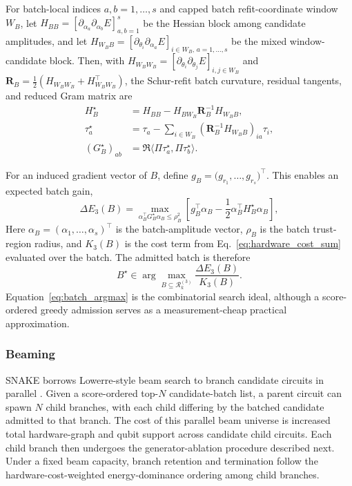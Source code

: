 \documentclass[
  reprint,
  amsmath,
  amssymb,
  aps,
  pra,
  nofootinbib,
  superscriptaddress,
  floatfix
]{revtex4-2}
\begin{document}
For batch-local indices \(a,b=1,\ldots,s\) and capped batch refit-coordinate window \(W_B\), let $H_{BB}=[\partial_{\alpha_a}\partial_{\alpha_b}E]_{a,b=1}^s$ be the Hessian block among candidate amplitudes, and let $H_{W_BB}=[\partial_{\theta_i}\partial_{\alpha_a}E]_{i\in W_B,\,a=1,\ldots,s}$ be the mixed window-candidate block. Then, with $H_{W_BW_B}=[\partial_{\theta_i}\partial_{\theta_j}E]_{i,j\in W_B}$ and $\mathbf R_B=\frac12(H_{W_BW_B}+H_{W_BW_B}^{\top})$, the Schur-refit batch curvature, residual tangents, and reduced Gram matrix are
\begin{equation*}
\begin{aligned}
H_B^\star
&=
H_{BB}
-
H_{BW_B}\mathbf R_B^{-1}H_{W_BB},\\
\tau_a^\star
&=\tau_a-\sum_{i\in W_B}(\mathbf R_B^{-1}H_{W_BB})_{ia}\tau_i,\\
(G_B^\star)_{ab}
&=\Re\langle \Pi\tau_a^\star,\Pi\tau_b^\star\rangle .
\end{aligned}
\end{equation*}

For an induced gradient vector of $B$, define \(g_B=\big(g_{r_1},\ldots,g_{r_s}\big)^\top\). This enables an expected batch gain,
\begin{equation*}
\Delta E_3(B)
=
\max_{\alpha_B^\top G_B^\star\alpha_B\le \rho_B^2}
\left[
g_B^\top\alpha_B
-
\frac12\alpha_B^\top H_B^\star\alpha_B
\right],
\end{equation*}
Here \(\alpha_B=(\alpha_1,\ldots,\alpha_s)^\top\) is the batch-amplitude vector, \(\rho_B\) is the batch trust-region radius, and \(K_3(B)\) is the cost term from Eq.~\eqref{eq:hardware_cost_sum} evaluated over the batch. The admitted batch is therefore
\begin{equation}
B^\star\in\arg\max_{B\subseteq\mathcal R_k^{(3)}}\frac{\Delta E_3(B)}{K_3(B)}.
\label{eq:batch_argmax}
\end{equation}
Equation~\eqref{eq:batch_argmax} is the combinatorial search ideal, although a score-ordered greedy admission serves as a measurement-cheap practical approximation. 

\subsubsection{Beaming}
\textsc{SNAKE} borrows Lowerre-style beam search to branch candidate circuits in parallel \cite{Lowerre1976Beam}. Given a score-ordered top-$N$ candidate-batch list, a parent circuit can spawn $N$ child branches, with each child differing by the batched candidate admitted to that branch. The cost of this parallel beam universe is increased total hardware-graph and qubit support across candidate child circuits. Each child branch then undergoes the generator-ablation procedure described next. Under a fixed beam capacity, branch retention and termination follow the hardware-cost-weighted energy-dominance ordering among child branches.
\end{document}
